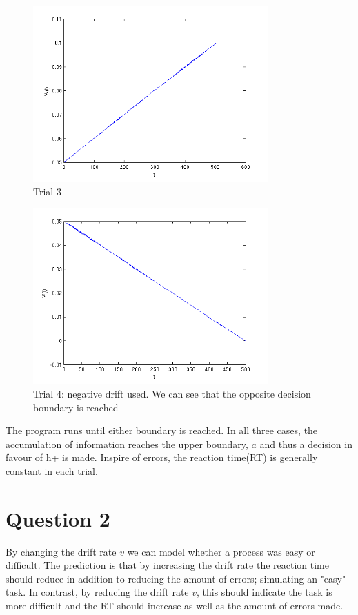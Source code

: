 \documentclass[11pt, twocolumn]{report}
\begin{document}
\begin{figure}[H]
\centering
\includegraphics[width=90mm]{assignment2_images/p1_1_3.png}
\caption{Trial 3}
\label{p1_1_3}
\end{figure}

\begin{figure}[H]
\centering
\includegraphics[width=90mm]{assignment2_images/part1_neg.png}
\caption{Trial 4: negative drift used. We can see that the opposite decision boundary is reached}
\label{p1_1_4}
\end{figure}

The program runs until either boundary is reached. In all three cases, the accumulation of information reaches the upper boundary, $a$ and thus a decision in favour of h+ is made. Inspire of errors, the reaction time(RT) is generally constant in each trial.

\section{Question 2}

By changing the drift rate $v$ we can model whether a process was easy or difficult. The prediction is that by increasing the drift rate the reaction time should reduce in addition to reducing the amount of errors; simulating an "easy" task. In contrast, by reducing the drift rate $v$, this should indicate the task is more difficult and the RT should increase as well as the amount of errors made.
\end{document}
